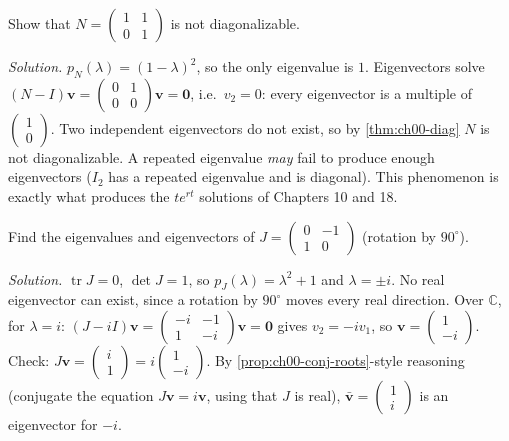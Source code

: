 \begin{example}\label{ex:ch00-jordan}
Show that $N = \begin{pmatrix}1&1\\0&1\end{pmatrix}$ is not diagonalizable.

\emph{Solution.} $p_N(\lambda) = (1-\lambda)^2$, so the only eigenvalue is
$1$. Eigenvectors solve
$(N - I)\mathbf v = \left(\begin{smallmatrix}0&1\\0&0\end{smallmatrix}\right)\mathbf v = \mathbf0$,
i.e.\ $v_2 = 0$: every eigenvector is a multiple of
$\left(\begin{smallmatrix}1\\0\end{smallmatrix}\right)$. Two independent
eigenvectors do not exist, so by \cref{thm:ch00-diag} $N$ is not
diagonalizable. A repeated eigenvalue \emph{may} fail to produce enough
eigenvectors ($I_2$ has a repeated eigenvalue and is diagonal). This
phenomenon is exactly what produces the $te^{rt}$ solutions of Chapters 10
and 18.
\end{example}

\begin{example}\label{ex:ch00-rotation}
Find the eigenvalues and eigenvectors of $J = \begin{pmatrix}0&-1\\1&0\end{pmatrix}$
(rotation by $90^\circ$).

\emph{Solution.} $\operatorname{tr}J = 0$, $\det J = 1$, so
$p_J(\lambda) = \lambda^2 + 1$ and $\lambda = \pm i$. No real eigenvector can
exist, since a rotation by $90^\circ$ moves every real direction. Over
$\mathbb{C}$, for $\lambda = i$:
$(J - iI)\mathbf v = \left(\begin{smallmatrix}-i&-1\\1&-i\end{smallmatrix}\right)\mathbf v = \mathbf0$
gives $v_2 = -iv_1$, so $\mathbf v = \left(\begin{smallmatrix}1\\-i\end{smallmatrix}\right)$.
Check: $J\mathbf v = \left(\begin{smallmatrix}i\\1\end{smallmatrix}\right) = i\left(\begin{smallmatrix}1\\-i\end{smallmatrix}\right)$.
By \cref{prop:ch00-conj-roots}-style reasoning (conjugate the equation
$J\mathbf v = i\mathbf v$, using that $J$ is real),
$\bar{\mathbf v} = \left(\begin{smallmatrix}1\\i\end{smallmatrix}\right)$ is an
eigenvector for $-i$.
\end{example}

